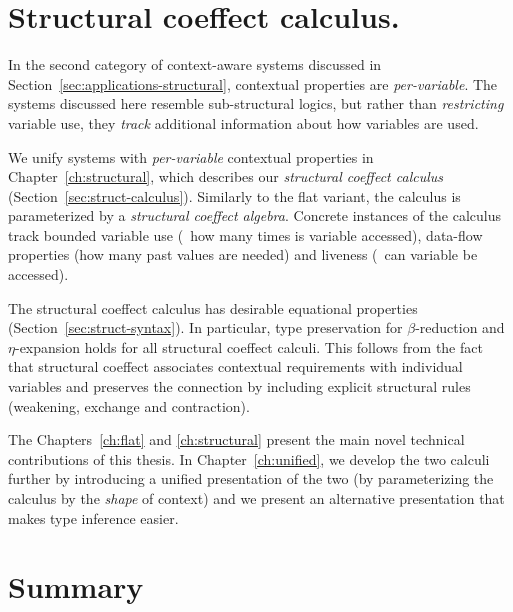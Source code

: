 
\section{Structural coeffect calculus.}

In the second category of context-aware systems discussed in Section~\ref{sec:applications-structural},
contextual properties are \emph{per-variable}. The systems discussed here resemble sub-structural
logics, but rather than \emph{restricting} variable use, they \emph{track} additional information
about how variables are used.

We unify systems with \emph{per-variable} contextual properties in Chapter~\ref{ch:structural},
which describes our \emph{structural coeffect calculus} (Section~\ref{sec:struct-calculus}). 
Similarly to the flat variant, the calculus is parameterized by a \emph{structural coeffect algebra}. 
Concrete instances of the calculus track bounded variable use (\ie~how many times is variable 
accessed), data-flow properties (how many past values are needed) and liveness (\ie~can variable 
be accessed). 

The structural coeffect calculus has desirable equational properties (Section~\ref{sec:struct-syntax}).
In particular, type preservation for $\beta$-reduction and $\eta$-expansion holds for all structural
coeffect calculi. This follows from the fact that structural coeffect associates contextual requirements
with individual variables and preserves the connection by including explicit structural rules
(weakening, exchange and contraction).

The Chapters~\ref{ch:flat} and \ref{ch:structural} present the main novel technical contributions of this
thesis. In Chapter~\ref{ch:unified}, we develop the two calculi further by introducing a unified
presentation of the two (by parameterizing the calculus by the \emph{shape} of context) and we present
an alternative presentation that makes type inference easier.


\section{Summary}


